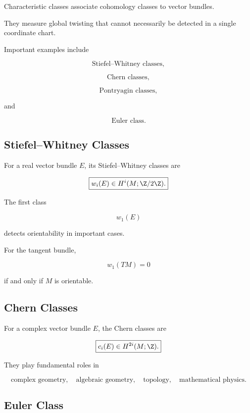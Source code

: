 Characteristic classes associate cohomology classes to vector bundles.

They measure global twisting that cannot necessarily be detected in a
single coordinate chart.

Important examples include

\[
\boxed{
\text{Stiefel--Whitney classes},
}
\]

\[
\boxed{
\text{Chern classes},
}
\]

\[
\boxed{
\text{Pontryagin classes},
}
\]

and

\[
\boxed{
\text{Euler class}.
}
\]

\subsection{Stiefel--Whitney Classes}
\label{subsec:stiefel-whitney-manifolds}

For a real vector bundle \(E\), its Stiefel--Whitney classes are

\[
\boxed{
w_i(E)
\in
H^i(M;\Z/2\Z).
}
\]

The first class

\[
\boxed{
w_1(E)
}
\]

detects orientability in important cases.

For the tangent bundle,

\[
\boxed{
w_1(TM)=0
}
\]

if and only if \(M\) is orientable.

\subsection{Chern Classes}
\label{subsec:chern-classes-manifolds}

For a complex vector bundle \(E\), the Chern classes are

\[
\boxed{
c_i(E)
\in
H^{2i}(M;\Z).
}
\]

They play fundamental roles in

\[
\boxed{
\text{complex geometry},
\quad
\text{algebraic geometry},
\quad
\text{topology},
\quad
\text{mathematical physics}.
}
\]

\subsection{Euler Class}
\label{subsec:euler-class-manifolds}


